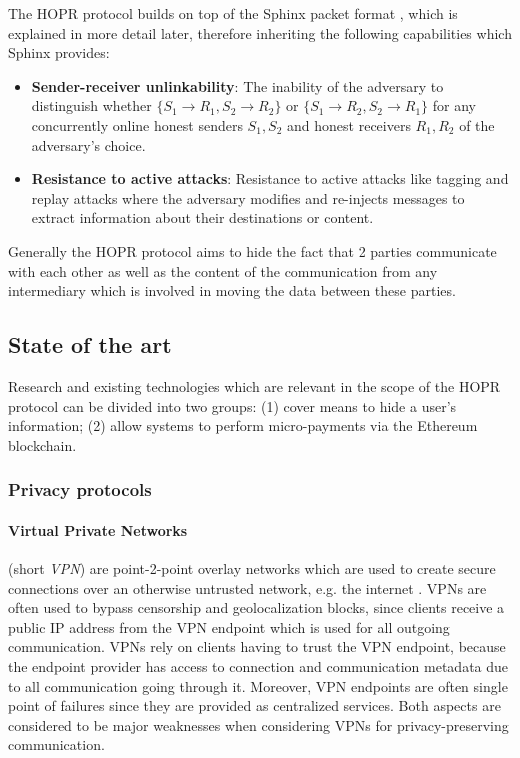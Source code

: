 The HOPR protocol builds on top of the Sphinx packet format \cite{sphinxpaper}, which is explained
in more detail later, therefore inheriting the following capabilities which Sphinx provides:

\begin{itemize}

    \item \textbf{Sender-receiver unlinkability}: The inability of the adversary
        to distinguish whether $\{S_1\rightarrow R_1, S_2\rightarrow R_2\}$ or
        $\{S_1\rightarrow R_2, S_2\rightarrow R_1\}$ for any concurrently online
        honest senders $S_1,S_2$ and honest receivers $R_1,R_2$ of the
        adversary’s choice.

    \item \textbf{Resistance to active attacks}: Resistance to active attacks
        like tagging and replay attacks where the adversary modifies and
        re-injects messages to extract information about their destinations or
        content.

\end{itemize}

Generally the HOPR protocol aims to hide the fact that 2 parties
communicate with each other as well as the content of the communication from any
intermediary which is involved in moving the data between these parties.

\subsection{State of the art}
\label{sec:stateoftheart}

Research and existing technologies which are relevant in the scope of the HOPR
protocol can be divided into two groups: (1)  cover
means to hide a user's information; (2)  allow systems
to perform micro-payments via the Ethereum blockchain.

\subsubsection{Privacy protocols}
\label{sec:privacyprotocols}

\paragraph{Virtual Private Networks} (short \textit{VPN}) are point-2-point
overlay networks which are used to create secure connections over an otherwise
untrusted network, e.g. the internet \cite{venkateswaran_2001}. VPNs are often
used to bypass censorship \cite{hobbs_roberts_2018} and geolocalization blocks,
since clients receive a public IP address from the VPN endpoint which is used
for all outgoing communication. VPNs rely on clients having to trust the VPN
endpoint, because the endpoint provider has access to connection and
communication metadata due to all communication going through it. Moreover, VPN
endpoints are often single point of failures since they are provided as
centralized services. Both aspects are considered to be major weaknesses when
considering VPNs for privacy-preserving communication.

